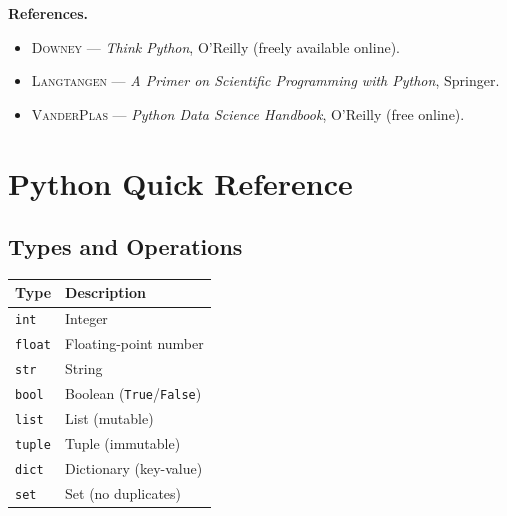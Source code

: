 \documentclass[12pt,a4paper,twoside]{book}
\theoremstyle{definition}
\theoremstyle{remark}
\newcommand{\py}[1]{\texttt{#1}}
\begin{document}
\medskip
\textbf{References.}
\begin{itemize}
\item \textsc{Downey} --- \emph{Think Python}, O'Reilly (freely available online).
\item \textsc{Langtangen} --- \emph{A Primer on Scientific Programming with Python}, Springer.
\item \textsc{VanderPlas} --- \emph{Python Data Science Handbook}, O'Reilly (free online).
\end{itemize}

\mainmatter














\backmatter
\appendix
\chapter{Python Quick Reference}
\label{app:python}

\section{Types and Operations}
\begin{tabular}{ll}
\toprule
\textbf{Type} & \textbf{Description} \\
\midrule
\py{int} & Integer \\
\py{float} & Floating-point number \\
\py{str} & String \\
\py{bool} & Boolean (\py{True}/\py{False}) \\
\py{list} & List (mutable) \\
\py{tuple} & Tuple (immutable) \\
\py{dict} & Dictionary (key-value) \\
\py{set} & Set (no duplicates) \\
\bottomrule
\end{tabular}
\end{document}
